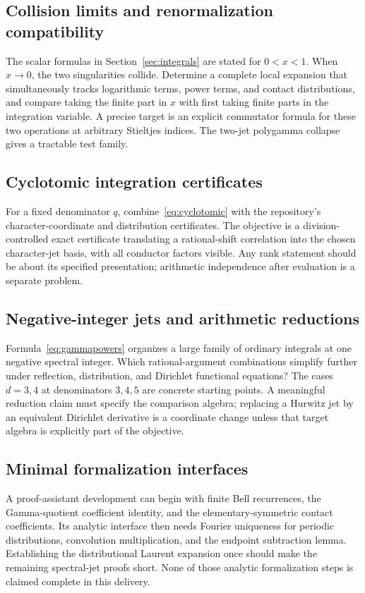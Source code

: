 \documentclass[11pt]{article}
\numberwithin{equation}{section}
\theoremstyle{definition}
\theoremstyle{remark}
\begin{document}
\subsection{Collision limits and renormalization compatibility}
The scalar formulas in Section~\ref{sec:integrals} are stated for
$0<x<1$. When $x\to0$, the two singularities collide. Determine a
complete local expansion that simultaneously tracks logarithmic terms,
power terms, and contact distributions, and compare taking the
finite part in $x$ with first taking finite parts in the integration
variable. A precise target is an explicit commutator formula for these
two operations at arbitrary Stieltjes indices. The two-jet polygamma
collapse gives a tractable test family.

\subsection{Cyclotomic integration certificates}
For a fixed denominator $q$, combine~\eqref{eq:cyclotomic} with the
repository's character-coordinate and distribution certificates. The
objective is a division-controlled exact certificate translating a
rational-shift correlation into the chosen character-jet basis, with
all conductor factors visible. Any rank statement should be about its
specified presentation; arithmetic independence after evaluation is a
separate problem.

\subsection{Negative-integer jets and arithmetic reductions}
Formula~\eqref{eq:gammapowers} organizes a large family of ordinary
integrals at one negative spectral integer. Which rational-argument
combinations simplify further under reflection, distribution, and
Dirichlet functional equations? The cases $d=3,4$ at denominators $3,4,5$
are concrete starting points. A meaningful reduction claim must specify
the comparison algebra; replacing a Hurwitz jet by an equivalent
Dirichlet derivative is a coordinate change unless that target algebra
is explicitly part of the objective.

\subsection{Minimal formalization interfaces}
A proof-assistant development can begin with finite Bell recurrences,
the Gamma-quotient coefficient identity, and the elementary-symmetric
contact coefficients. Its analytic interface then needs Fourier
uniqueness for periodic distributions, convolution multiplication,
and the endpoint subtraction lemma. Establishing the distributional
Laurent expansion once should make the remaining spectral-jet proofs
short. None of those analytic formalization steps is claimed complete
in this delivery.
\end{document}
